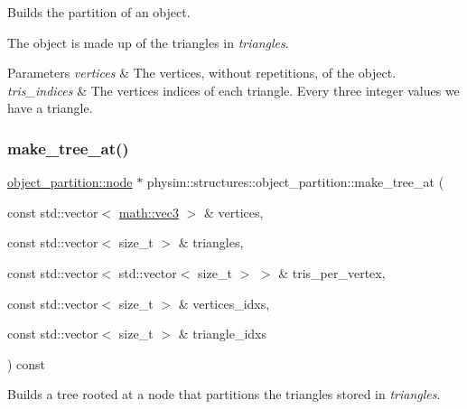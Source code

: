 Builds the partition of an object. 

The object is made up of the triangles in {\itshape triangles}. 
\begin{DoxyParams}{Parameters}
{\em vertices} & The vertices, without repetitions, of the object. \\
\hline
{\em tris\+\_\+indices} & The vertices indices of each triangle. Every three integer values we have a triangle. \\
\hline
\end{DoxyParams}
\mbox{\label{classphysim_1_1structures_1_1object__partition_ad69ce29b93aa13415421c1d7bb303e71}} 
\subsubsection{\texorpdfstring{make\+\_\+tree\+\_\+at()}{make\_tree\_at()}}
{\footnotesize\ttfamily \hyperlink{structphysim_1_1structures_1_1object__partition_1_1node}{object\+\_\+partition\+::node} $\ast$ physim\+::structures\+::object\+\_\+partition\+::make\+\_\+tree\+\_\+at (\begin{DoxyParamCaption}\item[{const std\+::vector$<$ \hyperlink{structphysim_1_1math_1_1vec3}{math\+::vec3} $>$ \&}]{vertices,  }\item[{const std\+::vector$<$ size\+\_\+t $>$ \&}]{triangles,  }\item[{const std\+::vector$<$ std\+::vector$<$ size\+\_\+t $>$ $>$ \&}]{tris\+\_\+per\+\_\+vertex,  }\item[{const std\+::vector$<$ size\+\_\+t $>$ \&}]{vertices\+\_\+idxs,  }\item[{const std\+::vector$<$ size\+\_\+t $>$ \&}]{triangle\+\_\+idxs }\end{DoxyParamCaption}) const\hspace{0.3cm}{\ttfamily [private]}}



Builds a tree rooted at a node that partitions the triangles stored in {\itshape triangles}. 


